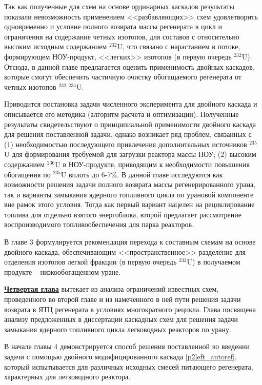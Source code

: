 Так как полученные для схем на основе ординарных каскадов результаты показали невозможность применением <<разбавляющих>> схем удовлетво­рить одновременно и условие полного возврата массы регенерата в цикл и
ограничения на содержание четных изотопов, для составов с относительно высоким исходным содержанием $^{232}$U, что связано с нарастанием в потоке, формирующем НОУ-продукт, <<легких>> изотопов (в первую очередь $^{232}$U). Отсюда, в данной главе предлагается оценить применимость двойных каскадов, которые смогут обеспечить частичную очистку обогащаемого регенерата от четных изотопов $^{232,234}$U.

Приводится постановка задачи численного эксперимента для двойного каскада и описывается его методика (алгоритм расчета и оптимизации). Полученные результаты свидетельствуют о принципиальной применимости двойного каскада для решения поставленной задачи, однако возникает ряд проблем, связанных с (1) необходимостью последующего привлечения дополнительных источников $^{235}$U для формирования требуемой для загрузки реактора массы НОУ; (2) высоким содержанием $^{236}$U в НОУ-продукте, приводящим к необходимости повышения обогащения по $^{235}$U вплоть до 6-7\%.
В данной главе исследуются как возможности решения задачи полного возврата массы регенерированного урана, так и варианты замыкания ядерного топливного цикла по урановой компоненте вне рамок этого условия. Тогда как первый вариант нацелен на рециклирование топлива для отдельно взятого энергоблока, второй предлагает рассмотрение воспроизводимого топливообеспечения для парка реакторов.

В главе 3 формулируется рекомендация перехода к составным схемам на основе двойного каскада, обеспечивающим <<пространственное>> разделение для отделения изотопов легкой фракции (в первую очередь $^{232}$U) в получаемом продукте -- низкообогащенном уране.

\underline{\textbf{Четвертая глава}} вытекает из анализа ограничений известных схем, проведенного во второй главе и из намеченного в ней пути решения задачи возврата в ЯТЦ регенерата в условиях многократного рецикла.
Глава посвящена анализу предложенных в диссертации каскадных схем для решения задачи замыкания ядерного топливного цикла легководных реакторов по урану.

В начале главы 4 демонстрируется способ решения поставленной во введении задачи с помощью двойного модифицированного каскада \ref{p2left_autoref}, который испытывается для различных исходных смесей питающего регенерата, характерных для легководного реактора.

